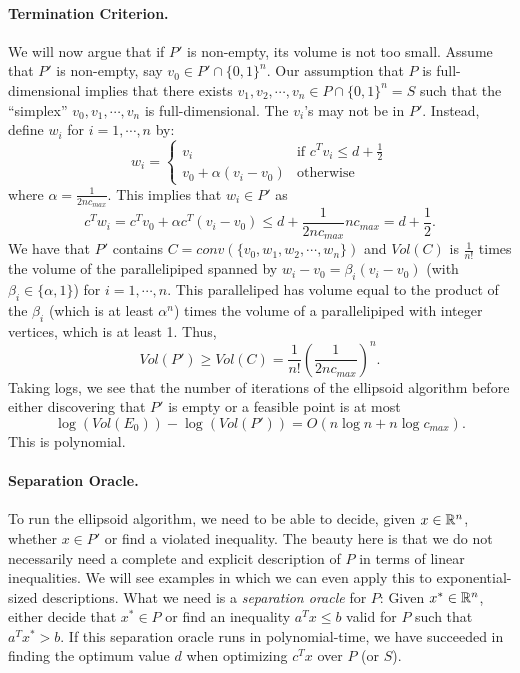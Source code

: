 \documentclass[12pt]{article}
\begin{document}
\paragraph{Termination Criterion.}
We will now argue that if $P'$ is non-empty, its volume is not too
small. Assume that $P'$ is non-empty, say $v_0\in
P'\cap\{0,1\}^n$. Our assumption that $P$ is full-dimensional implies
that there exists $v_1, v_2, \cdots, v_n\in P\cap \{0,1\}^n=S$ such
that the ``simplex'' $v_0, v_1, \cdots, v_n$ is full-dimensional. The
$v_i$'s may not be in $P'$. Instead, define $w_i$ for $i=1,\cdots,n$
by:
$$w_i =\left\{\begin{array}{ll} v_i & \mbox{if } c^Tv_i \leq
d+\frac{1}{2} \\ v_0 + \alpha (v_i-v_0) & \mbox{otherwise} \end{array}\right.$$
where $\alpha=\frac{1}{2n c_{max}}$. This implies that $w_i\in P'$ as
$$c^Tw_i = c^Tv_0 + \alpha c^T(v_i-v_0) \leq d + \frac{1}{2n c_{max}}
n c_{max} = d+\frac{1}{2}.$$ We have that $P'$ contains $C=conv(\{v_0,
w_1, w_2, \cdots, w_n\})$ and $Vol(C)$ is $\frac{1}{n!}$ times the
volume of the parallelipiped spanned by $w_i-v_0=\beta_i (v_i-v_0)$
(with $\beta_i\in \{\alpha,1\}$) for $i=1,\cdots,n$. This paralleliped
has volume equal to the product of the $\beta_i$ (which is at least
$\alpha^n$) times the volume of a parallelipiped with integer
vertices, which is at least 1. Thus,
$$Vol(P')\geq Vol(C)=\frac{1}{n!}\left(\frac{1}{2n
  c_{max}}\right)^n.$$ Taking logs, we see that the number of
  iterations of the ellipsoid algorithm before either discovering that
  $P'$ is empty or a feasible point is at most
  $$\log(Vol(E_0))-\log(Vol(P'))=O(n\log n + n \log c_{max}).$$
This is polynomial. 

\paragraph{Separation Oracle.} To run the ellipsoid algorithm, we need
to be able to decide, given $x\in {\mathbb R}^n$, whether $x\in P'$ or find a
violated inequality. The beauty here is that we do not necessarily
need a complete and explicit description of $P$ in terms of linear
inequalities. We will see examples in which we can even apply this to
exponential-sized descriptions. What we need is a {\it separation
  oracle} for $P$: Given $x^*\in {\mathbb R}^n$, either decide that $x^*\in P$ or
find an inequality $a^Tx\leq b$ valid for $P$ such that $a^Tx^*>b$. If
this separation oracle runs in polynomial-time, we have succeeded in
finding the optimum value $d$ when optimizing $c^Tx$ over $P$ (or
$S$). 
\end{document}

